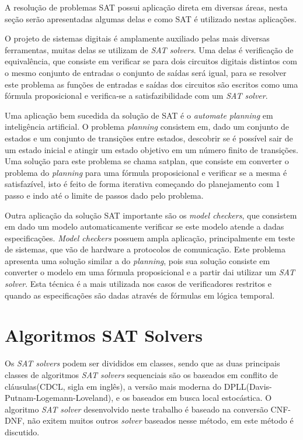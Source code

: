 \documentclass{ufsc-thesis}
\begin{document}
A resolução de problemas SAT possui aplicação direta em diversas áreas, 
nesta seção serão apresentadas algumas delas e como SAT é utilizado nestas 
aplicações.

O projeto de sistemas digitais é amplamente auxiliado pelas mais diversas 
ferramentas, muitas delas se utilizam de \textit{SAT solvers}\cite{Lavagno2006}. Uma delas é verificação 
de equivalência, que consiste em verificar se para dois circuitos digitais 
distintos com o mesmo conjunto de entradas o conjunto de saídas será igual, 
para se resolver este problema as funções de entradas e saídas dos circuitos 
são escritos como uma fórmula proposicional e verifica-se a satisfazibilidade 
com um \textit{SAT solver}.

Uma aplicação bem sucedida da solução de SAT é o \textit{automate planning} em 
inteligência artificial\cite{Kautz1992}. O problema \textit{planning} consistem em, 
dado um conjunto de estados e um conjunto de transições entre estados, 
descobrir se é possível sair de um estado inicial e atingir um estado 
objetivo em um número finito de transições. Uma solução para este problema 
se chama satplan\cite{Kautz1992}, que consiste em converter o problema do \textit{planning}
para uma fórmula proposicional e verificar se a mesma é satisfazível, isto é 
feito de forma iterativa começando do planejamento com 1 passo e indo até 
o limite de passos dado pelo problema.

Outra aplicação da solução SAT importante são os \textit{model checkers}\cite{Biere},
que consistem em dado um modelo automaticamente verificar se este modelo 
atende a dadas especificações. \textit{Model checkers} possuem ampla aplicação, 
principalmente em teste de sistemas, que vão de hardware a protocolos de comunicação.
Este problema apresenta uma solução similar a do \textit{planning}, pois sua solução 
consiste em converter o modelo em uma fórmula proposicional e a partir dai utilizar um 
\textit{SAT solver}\cite{Clarke2001}. Esta técnica é a mais utilizada nos casos de verificadores 
restritos e quando as especificações são dadas através de fórmulas em lógica 
temporal.

\section{Algoritmos SAT Solvers}
\label{sec:solver}

Os \textit{SAT solvers} podem ser divididos em classes, sendo que as 
duas principais classes de algoritmos \textit{SAT solvers} sequenciais 
são os baseados em conflito de cláusulas(CDCL, sigla em inglês), a 
versão mais moderna do DPLL(Davis-Putnam-Logemann-Loveland)\cite{Davis1962}, e os 
baseados em busca local estocástica\cite{Selman95}. O algoritmo \textit{SAT solver} 
desenvolvido neste trabalho é baseado na conversão CNF-DNF, 
não exitem muitos outros \textit{solver} baseados nesse método, 
em \cite{Miltersen} \cite{Katajainen} este método é discutido.
\end{document}
